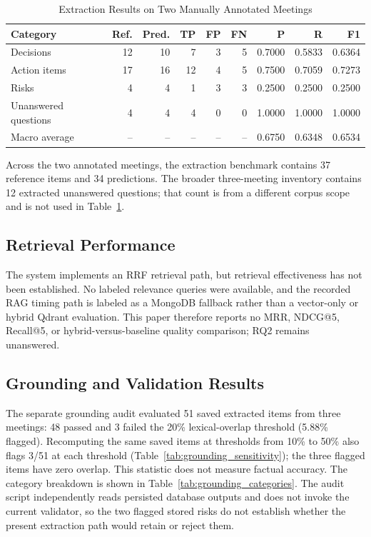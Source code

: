 \documentclass[conference]{IEEEtran}
\begin{document}
\begin{table}[t]
\caption{Extraction Results on Two Manually Annotated Meetings}
\label{tab:extraction}
\centering
\scriptsize
\begin{tabular}{@{}lrrrrrrrr@{}}
\toprule
\textbf{Category} & \textbf{Ref.} & \textbf{Pred.} & \textbf{TP} & \textbf{FP} & \textbf{FN} & \textbf{P} & \textbf{R} & \textbf{F1} \\
\midrule
Decisions & 12 & 10 & 7 & 3 & 5 & 0.7000 & 0.5833 & 0.6364 \\
Action items & 17 & 16 & 12 & 4 & 5 & 0.7500 & 0.7059 & 0.7273 \\
Risks & 4 & 4 & 1 & 3 & 3 & 0.2500 & 0.2500 & 0.2500 \\
Unanswered questions & 4 & 4 & 4 & 0 & 0 & 1.0000 & 1.0000 & 1.0000 \\
Macro average & -- & -- & -- & -- & -- & 0.6750 & 0.6348 & 0.6534 \\
\bottomrule
\end{tabular}
\end{table}

Across the two annotated meetings, the extraction benchmark contains 37 reference items and 34 predictions. The broader three-meeting inventory contains 12 extracted unanswered questions; that count is from a different corpus scope and is not used in Table~\ref{tab:extraction}.

\subsection{Retrieval Performance}
The system implements an RRF retrieval path, but retrieval effectiveness has not been established. No labeled relevance queries were available, and the recorded RAG timing path is labeled as a MongoDB fallback rather than a vector-only or hybrid Qdrant evaluation. This paper therefore reports no MRR, NDCG@5, Recall@5, or hybrid-versus-baseline quality comparison; RQ2 remains unanswered.

\subsection{Grounding and Validation Results}
The separate grounding audit evaluated 51 saved extracted items from three meetings: 48 passed and 3 failed the 20\% lexical-overlap threshold (5.88\% flagged). Recomputing the same saved items at thresholds from 10\% to 50\% also flags 3/51 at each threshold (Table~\ref{tab:grounding_sensitivity}); the three flagged items have zero overlap. This statistic does not measure factual accuracy. The category breakdown is shown in Table~\ref{tab:grounding_categories}. The audit script independently reads persisted database outputs and does not invoke the current validator, so the two flagged stored risks do not establish whether the present extraction path would retain or reject them.
\end{document}
